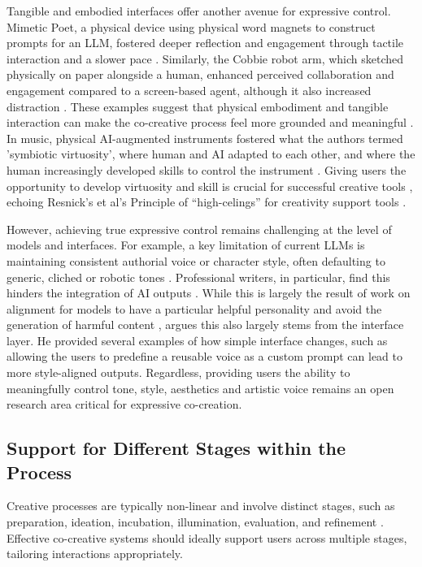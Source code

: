 Tangible and embodied interfaces offer another avenue for expressive control. Mimetic Poet, a physical device using physical word magnets to construct prompts for an LLM, fostered deeper reflection and engagement through tactile interaction and a slower pace \citep{McCormack2024-gv}. Similarly, the Cobbie robot arm, which sketched physically on paper alongside a human, enhanced perceived collaboration and engagement compared to a screen-based agent, although it also increased distraction \citep{Lin2020-ji}. These examples suggest that physical embodiment and tangible interaction can make the co-creative process feel more grounded and meaningful \citep{McCormack2024-gv, Lin2020-ji}. In music, physical AI-augmented instruments fostered what the authors termed 'symbiotic virtuosity', where human and AI adapted to each other, and where the human increasingly developed skills to control the instrument \citep{Blanchard2024-jz}. Giving users the opportunity to develop virtuosity and skill is crucial for successful creative tools \citep{Lee2024-tu}, echoing Resnick's et al's Principle of ``high-celings'' for creativity support tools \citep{Resnick2005-fs}. 

However, achieving true expressive control remains challenging at the level of models and interfaces. For example, a key limitation of current LLMs is maintaining consistent authorial voice or character style, often defaulting to generic, cliched or robotic tones \citep{Ippolito2022-mf, Yuan2022-kb, Chakrabarty2024-ov}. Professional writers, in particular, find this hinders the integration of AI outputs \citep{Ippolito2022-mf, Grigis2024-pf}. While this is largely the result of work on alignment for models to have a particular helpful personality and avoid the generation of harmful content \citep{Anthropic2024-ne, Ouyang2022-af, Bai2022-ec}, \citet{Koomen2025-eu} argues this also largely stems from the interface layer. He provided several examples of how simple interface changes, such as allowing the users to predefine a reusable voice as a custom prompt can lead to more style-aligned outputs. Regardless, providing users the ability to meaningfully control tone, style, aesthetics and artistic voice remains an open research area critical for expressive co-creation.

\subsection{Support for Different Stages within the Process}

Creative processes are typically non-linear and involve distinct stages, such as preparation, ideation, incubation, illumination, evaluation, and refinement \citep{Wallas1926-ky, Design-Council2004-fv}. Effective co-creative systems should ideally support users across multiple stages, tailoring interactions appropriately.

